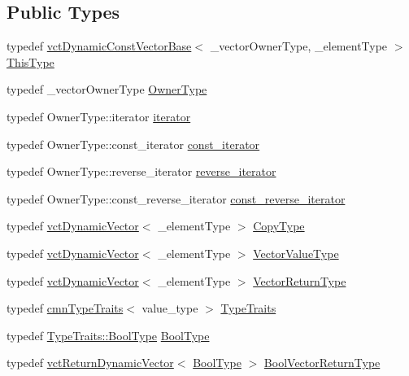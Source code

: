 \subsection*{Public Types}
\begin{DoxyCompactItemize}
\item 
typedef \hyperlink{classvct_dynamic_const_vector_base}{vct\+Dynamic\+Const\+Vector\+Base}$<$ \+\_\+vector\+Owner\+Type, \+\_\+element\+Type $>$ \hyperlink{classvct_dynamic_const_vector_base_a39da273523717f678f54d3321ebca3dd}{This\+Type}
\item 
typedef \+\_\+vector\+Owner\+Type \hyperlink{classvct_dynamic_const_vector_base_a6d92548fcc7076cbd4c091ceb0faf364}{Owner\+Type}
\item 
typedef Owner\+Type\+::iterator \hyperlink{classvct_dynamic_const_vector_base_aaed13bc31a9ee4971bad765ba5c2c811}{iterator}
\item 
typedef Owner\+Type\+::const\+\_\+iterator \hyperlink{classvct_dynamic_const_vector_base_ad04d1e54698ac5e244d15dfacd0e603c}{const\+\_\+iterator}
\item 
typedef Owner\+Type\+::reverse\+\_\+iterator \hyperlink{classvct_dynamic_const_vector_base_af10d167259519ceeca9276da3435e193}{reverse\+\_\+iterator}
\item 
typedef Owner\+Type\+::const\+\_\+reverse\+\_\+iterator \hyperlink{classvct_dynamic_const_vector_base_aadfcc99550b376238b6c793c17d19ca5}{const\+\_\+reverse\+\_\+iterator}
\item 
typedef \hyperlink{classvct_dynamic_vector}{vct\+Dynamic\+Vector}$<$ \+\_\+element\+Type $>$ \hyperlink{classvct_dynamic_const_vector_base_a010ba1a93ccebf494be5a188f923eb43}{Copy\+Type}
\item 
typedef \hyperlink{classvct_dynamic_vector}{vct\+Dynamic\+Vector}$<$ \+\_\+element\+Type $>$ \hyperlink{classvct_dynamic_const_vector_base_a8ffd0619835fb50d43c07502d231e6c8}{Vector\+Value\+Type}
\item 
typedef \hyperlink{classvct_dynamic_vector}{vct\+Dynamic\+Vector}$<$ \+\_\+element\+Type $>$ \hyperlink{classvct_dynamic_const_vector_base_a379e4153bb82059072257410945bf83c}{Vector\+Return\+Type}
\item 
typedef \hyperlink{classcmn_type_traits}{cmn\+Type\+Traits}$<$ value\+\_\+type $>$ \hyperlink{classvct_dynamic_const_vector_base_a83723d7033db878894d4ab6c39bda2a4}{Type\+Traits}
\item 
typedef \hyperlink{classcmn_type_traits_aaa41087228a7f165bcd9f4385e644e28}{Type\+Traits\+::\+Bool\+Type} \hyperlink{classvct_dynamic_const_vector_base_a4b96efa633976c8be7648bb4ec0392a7}{Bool\+Type}
\item 
typedef \hyperlink{classvct_return_dynamic_vector}{vct\+Return\+Dynamic\+Vector}$<$ \hyperlink{classvct_dynamic_const_vector_base_a4b96efa633976c8be7648bb4ec0392a7}{Bool\+Type} $>$ \hyperlink{classvct_dynamic_const_vector_base_a2de5b9c0f8c70782c548808d3ae4a453}{Bool\+Vector\+Return\+Type}
\end{DoxyCompactItemize}
